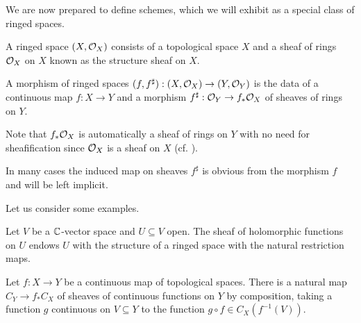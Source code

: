 We are now prepared to define schemes, which we will exhibit as a special class of ringed spaces. 
\begin{definition}\label{def: ringed space}
    A ringed space $(X,\mathcal{O}_{X})$ consists of a topological space $X$ and a sheaf of rings $\mathcal{O}_{X}$ on $X$ known as the structure sheaf on $X$. 
\end{definition}
\begin{definition}\label{def: morphism of ringed spaces}
    A morphism of ringed spaces $(f,f^{\sharp}):(X,\mathcal{O}_{X})\to (Y,\mathcal{O}_{Y})$ is the data of a continuous map $f:X\to Y$ and a morphism $f^{\sharp}:\mathcal{O}_{Y}\to f_{*}\mathcal{O}_{X}$ of sheaves of rings on $Y$. 
\end{definition}
\begin{remark}
    Note that $f_{*}\mathcal{O}_{X}$ is automatically a sheaf of rings on $Y$ with no need for sheafification since $\mathcal{O}_{X}$ is a sheaf on $X$ (cf. ). 
\end{remark}
\begin{remark}
    In many cases the induced map on sheaves $f^{\sharp}$ is obvious from the morphism $f$ and will be left implicit. 
\end{remark}
Let us consider some examples. 
\begin{example}\label{ex: holomorphic functions on open subspace of complex vector space}
    Let $V$ be a $\mathbb{C}$-vector space and $U\subseteq V$ open. The sheaf of holomorphic functions on $U$ endows $U$ with the structure of a ringed space with the natural restriction maps. 
\end{example}
\begin{example}\label{ex: sheaves of continuous functions are ringed spaces}
    Let $f:X\to Y$ be a continuous map of topological spaces. There is a natural map $C_{Y}\to f_{*}C_{X}$ of sheaves of continuous functions on $Y$ by composition, taking a function $g$ continuous on $V\subseteq Y$ to the function $g\circ f\in C_{X}(f^{-1}(V))$.
\end{example}